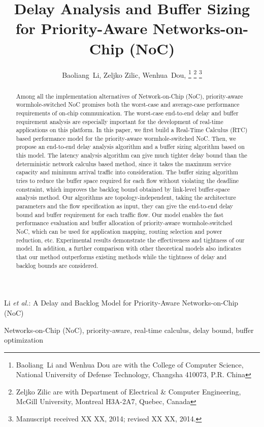 \documentclass[10pt,journal]{IEEEtran}
\begin{document}
\title{Delay Analysis and Buffer Sizing for Priority-Aware Networks-on-Chip (NoC)}

\author{Baoliang~Li, %
        Zeljko Zilic, %
        Wenhua~Dou, %
\thanks{Baoliang~Li and Wenhua Dou are with the College of Computer Science, National University of Defense Technology, Changsha 410073, P.R. China}%
\thanks{Zeljko Zilic are with Department of Electrical \& Computer Engineering, McGill University, Montreal H3A-2A7, Quebec, Canada}%
\thanks{Manuscript received XX XX, 2014; revised XX XX, 2014.}}

%
{Li \MakeLowercase{\textit{et al.}}: A Delay and Backlog Model for Priority-Aware Networks-on-Chip (NoC)}

\maketitle

\begin{abstract}
Among all the implementation alternatives of Network-on-Chip (NoC), priority-aware wormhole-switched NoC promises both the worst-case and average-case performance requirements of on-chip communication. The worst-case end-to-end delay and buffer requirement analysis are especially important for the development of real-time applications on this platform. In this paper, we first build a Real-Time Calculus (RTC) based performance model for the priority-aware wormhole-switched NoC. Then, we propose an end-to-end delay analysis algorithm and a buffer sizing algorithm based on this model. The latency analysis algorithm can give much tighter delay bound than the deterministic network calculus based method, since it takes the maximum service capacity and minimum arrival traffic into consideration. The buffer sizing algorithm tries to reduce the buffer space required for each flow without violating the deadline constraint, which improves the backlog bound obtained by link-level buffer-space analysis method. Our algorithms are topology-independent, taking the architecture parameters and the flow specification as input, they can give the end-to-end delay bound and buffer requirement for each traffic flow. Our model enables the fast performance evaluation and buffer allocation of priority-aware wormhole-switched NoC, which can be used for application mapping, routing selection and power reduction, etc. Experimental results demonstrate the effectiveness and tightness of our model. In addition, a further comparison with other theoretical models also indicates that our method outperforms existing methods while the tightness of delay and backlog bounds are considered.
\end{abstract}
\begin{IEEEkeywords}
Networks-on-Chip (NoC), priority-aware, real-time calculus, delay bound, buffer optimization
\end{IEEEkeywords}
\end{document}
